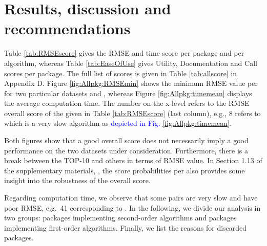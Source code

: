 \hypertarget{results-discussion-and-recommendations}{%
\section{Results, discussion and
recommendations}\label{results-discussion-and-recommendations}}

Table \ref{tab:RMSEscore} gives the RMSE and time score per package and
per algorithm, whereas Table \ref{tab:EaseOfUse} gives Utility,
Documentation and Call scores per package. The full list of scores is
given in Table \ref{tab:allscore} in Appendix D. Figure
\ref{fig:Allpkg:RMSEmin} shows the minimum RMSE value per
 for two particular datasets 
and , whereas Figure \ref{fig:Allpkg:timemean} displays
the average computation time. The number on the x-level refers to the
RMSE overall score of the  given in Table
\ref{tab:RMSEscore} (last column), e.g., 8 refers to
 which is a very slow algorithm as
\textcolor{blue}{depicted in Fig. \ref{fig:Allpkg:timemean}}.

Both figures show that a good overall score does not necessarily imply a
good performance on the two datasets under consideration. Furthermore,
there is a break between the TOP-10  and others
in terms of RMSE value. In Section 1.13 of the supplementary materials,
\citep{suppl:material:paper21}, the score probabilities per
 also provides some insight into the robustness
of the overall score.

Regarding computation time, we observe that some
 pairs are very slow and have poor RMSE, e.g.~41
corresponding to . In the following, we divide our
analysis in two groups: packages implementing second-order algorithms
and packages implementing first-order algorithms. Finally, we list the
reasons for discarded packages.



